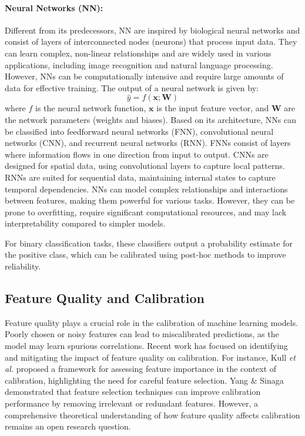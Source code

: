 \documentclass[12pt, a4paper]{article}
\begin{document}
\paragraph{Neural Networks (NN)\cite{goodfellow2016deep}:} Different from its predecessors, NN are inspired by biological neural networks and consist of layers of interconnected nodes (neurons) that process input data. They can learn complex, non-linear relationships and are widely used in various applications, including image recognition and natural language processing. However, NNs can be computationally intensive and require large amounts of data for effective training. The output of a neural network is given by:
\begin{equation}
\hat{y} = f(\mathbf{x}; \mathbf{W})
\end{equation}
where $f$ is the neural network function, $\mathbf{x}$ is the input feature vector, and $\mathbf{W}$ are the network parameters (weights and biases). Based on its architecture, NNs can be classified into feedforward neural networks (FNN), convolutional neural networks (CNN), and recurrent neural networks (RNN). FNNs consist of layers where information flows in one direction from input to output. CNNs are designed for spatial data, using convolutional layers to capture local patterns. RNNs are suited for sequential data, maintaining internal states to capture temporal dependencies. NNs can model complex relationships and interactions between features, making them powerful for various tasks. However, they can be prone to overfitting, require significant computational resources, and may lack interpretability compared to simpler models. 

For binary classification tasks, these classifiers output a probability estimate for the positive class, which can be calibrated using post-hoc methods to improve reliability.  


\subsection{Feature Quality and Calibration}

Feature quality plays a crucial role in the calibration of machine learning models. Poorly chosen or noisy features can lead to miscalibrated predictions, as the model may learn spurious correlations. Recent work has focused on identifying and mitigating the impact of feature quality on calibration. For instance, Kull \emph{et al.} \cite{kull2019beyond} proposed a framework for assessing feature importance in the context of calibration, highlighting the need for careful feature selection. Yang \& Sinaga \cite{yang2019feature} demonstrated that feature selection techniques can improve calibration performance by removing irrelevant or redundant features. However, a comprehensive theoretical understanding of how feature quality affects calibration remains an open research question. 
\end{document}
